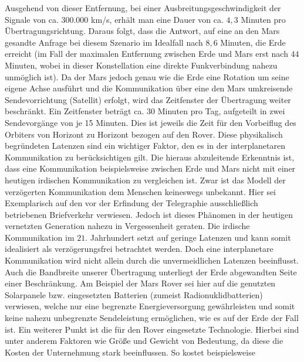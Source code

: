 Ausgehend von dieser Entfernung, bei einer Ausbreitungsgeschwindigkeit
der Signale von ca. $300.000$ km/s, erh{\"a}lt man eine Dauer von ca. $4,3$ Minuten
pro {\"U}bertragungsrichtung. Daraus folgt, dass die Antwort, auf eine an den
Mars gesandte Anfrage bei diesem Szenario im Idealfall nach $8,6$
Minuten, die Erde erreicht (im Fall der maximalen Entfernung zwischen Erde und
Mars erst nach $44$ Minuten, wobei in dieser Konstellation eine direkte
Funkverbindung nahezu unm{\"o}glich ist). Da der Mars jedoch genau wie die Erde
eine Rotation um seine eigene Achse ausf{\"u}hrt und die Kommunikation {\"u}ber eine den Mars
umkreisende Sendevorrichtung (Satellit) erfolgt, wird das Zeitfenster der
{\"U}bertragung weiter beschr{\"a}nkt. Ein Zeitfenster betr{\"a}gt ca. 30
Minuten pro Tag, aufgeteilt in zwei Sendevorg{\"a}nge von je 15 Minuten. Dies
ist jeweils die Zeit f{\"u}r den Vorbeiflug des Orbiters von Horizont zu Horizont bezogen
auf den Rover.\newline \newline
Diese physikalisch begr{\"u}ndeten Latenzen sind ein wichtiger Faktor, den es in
der interplanetaren Kommunikation zu ber{\"u}cksichtigen gilt. Die hieraus
abzuleitende Erkenntnis ist, dass eine Kommunikation beispielsweise zwischen
Erde und Mars nicht mit einer heutigen irdischen Kommunikation zu vergleichen
ist. Zwar ist das Modell der verz{\"o}gerten Kommunikation dem Menschen
keineswegs unbekannt.
Hier sei Exemplarisch auf den vor der Erfindung der Telegraphie
ausschlie{\ss}lich betriebenen Briefverkehr verwiesen. Jedoch ist dieses
Ph{\"a}nomen in der heutigen vernetzten Generation nahezu in Vergessenheit
geraten. Die irdische Kommunikation im $21$. Jahrhundert setzt auf geringe
Latenzen und kann somit idealisiert als verz{\"o}gerungsfrei betrachtet werden.
Doch eine interplanetare Kommunikation wird nicht allein durch die
unvermeidlichen Latenzen beeinflusst. Auch die Bandbreite unserer
{\"U}bertragung unterliegt der Erde abgewandten Seite einer Beschr{\"a}nkung. Am
Beispiel der Mars Rover sei hier auf die genutzten Solarpanele bzw. eingesetzten
Batterien (zumeist Radionuklidbatterien) verwiesen, welche nur eine begrenzte
Energieversorgung gew{\"a}hrleisten und somit keine nahezu unbegrenzte
Sendeleistung erm{\"o}glichen, wie es auf der Erde der Fall ist.\newline
Ein weiterer Punkt ist die f{\"u}r den Rover eingesetzte Technologie. Hierbei 
sind unter anderem Faktoren wie Gr{\"o}{\ss}e und Gewicht von Bedeutung, da 
diese die Kosten der Unternehmung stark beeinflussen. So kostet beispielsweise 
